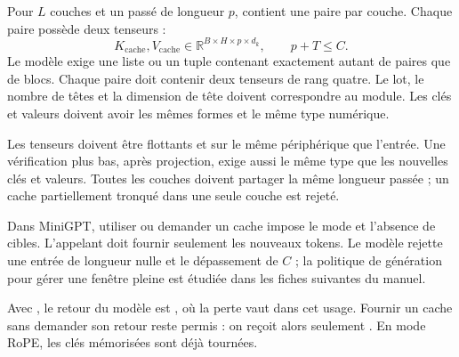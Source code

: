 



Pour $L$ couches et un passé de longueur $p$,  contient une paire par couche. Chaque paire possède deux tenseurs :
\[
 K_{\mathrm{cache}},V_{\mathrm{cache}}\in
 \mathbb{R}^{B\times H\times p\times d_k},
 \qquad p+T\leq C.
\]
Le modèle exige une liste ou un tuple contenant exactement autant de paires que de blocs. Chaque paire doit contenir deux tenseurs de rang quatre. Le lot, le nombre de têtes et la dimension de tête doivent correspondre au module. Les clés et valeurs doivent avoir les mêmes formes et le même type numérique.

Les tenseurs doivent être flottants et sur le même périphérique que l'entrée. Une vérification plus bas, après projection, exige aussi le même type que les nouvelles clés et valeurs. Toutes les couches doivent partager la même longueur passée ; un cache partiellement tronqué dans une seule couche est rejeté.

Dans MiniGPT, utiliser ou demander un cache impose le mode  et l'absence de cibles. L'appelant doit fournir seulement les nouveaux tokens. Le modèle rejette une entrée de longueur nulle et le dépassement de $C$ ; la politique de génération pour gérer une fenêtre pleine est étudiée dans les fiches suivantes du manuel.

Avec , le retour du modèle est , où la perte vaut  dans cet usage. Fournir un cache sans demander son retour reste permis : on reçoit alors seulement . En mode RoPE, les clés mémorisées sont déjà tournées.

